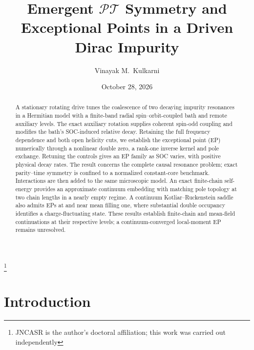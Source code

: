 \documentclass[%
  aps,physrev,onecolumn,10pt,amsmath,amssymb,superscriptaddress,longbibliography,floatfix
]{revtex4-2}
\newcommand{\PT}{\mathcal{PT}}
\begin{document}
\title{Emergent \texorpdfstring{$\PT$}{PT} Symmetry and Exceptional Points
       in a Driven Dirac Impurity}

\author{Vinayak M.~Kulkarni}
\thanks{JNCASR is the author's doctoral affiliation; this work was carried out independently}

\date{October 28, 2026}

\begin{abstract}
A stationary rotating drive tunes the coalescence of two decaying impurity
resonances in a Hermitian model with a finite-band radial spin--orbit-coupled
bath and remote auxiliary levels. The exact auxiliary rotation supplies
coherent spin-odd coupling and modifies the bath's SOC-induced relative
decay. Retaining the full frequency dependence and both open helicity cuts,
we establish the exceptional point (EP) numerically through a nonlinear
double zero, a rank-one inverse kernel and pole exchange. Retuning the
controls gives an EP family as SOC varies, with positive physical decay
rates. The result concerns the complete causal resonance problem; exact
parity--time symmetry is confined to a normalized constant-core benchmark.
Interactions are then added to the same microscopic model. An exact
finite-chain self-energy provides an approximate continuum embedding with
matching pole topology at two chain lengths in a nearly empty regime.
A continuum Kotliar--Ruckenstein saddle also admits EPs at and near mean
filling one, where substantial double occupancy identifies a
charge-fluctuating state. These results establish finite-chain and
mean-field continuations at their respective levels; a continuum-converged
local-moment EP remains unresolved.
\end{abstract}

\maketitle

\section{Introduction}
\label{sec:intro}
\end{document}
